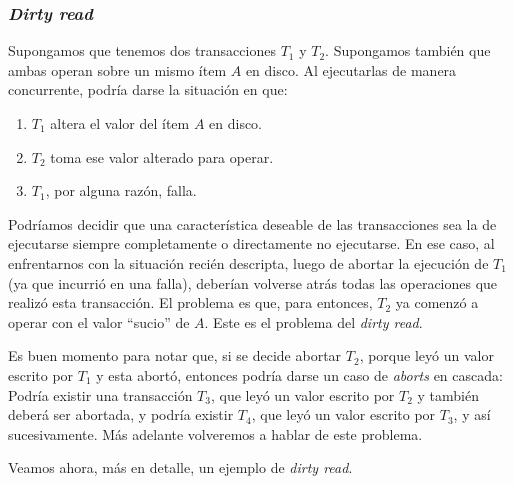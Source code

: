 \documentclass[english,titlepage]{article}
\theoremstyle{definition}
\theoremstyle{definition}
\begin{document}
\subsubsection{\emph{Dirty read}}

Supongamos que tenemos dos transacciones $T_1$ y $T_2$. Supongamos también que
ambas operan sobre un mismo ítem $A$ en disco. Al ejecutarlas de manera
concurrente, podría darse la situación en que:

\begin{enumerate}
    \item $T_1$ altera el valor del ítem $A$ en disco.
    \item $T_2$ toma ese valor alterado para operar.
    \item $T_1$, por alguna razón, falla.
\end{enumerate}

Podríamos decidir que una característica deseable de las transacciones sea la
de ejecutarse siempre completamente o directamente no ejecutarse. En ese caso,
al enfrentarnos con la situación recién descripta, luego de abortar la
ejecución de $T_1$ (ya que incurrió en una falla), deberían volverse atrás
todas las operaciones que realizó esta transacción. El problema es que, para
entonces, $T_2$ ya comenzó a operar con el valor ``sucio'' de $A$. Este es el
problema del \emph{dirty read}.

Es buen momento para notar que, si se decide abortar $T_2$, porque leyó un
valor escrito por $T_1$ y esta abortó, entonces podría darse un caso de
\emph{aborts} en cascada: Podría existir una transacción $T_3$, que leyó un
valor escrito por $T_2$ y también deberá ser abortada, y podría existir $T_4$,
que leyó un valor escrito por $T_3$, y así sucesivamente. Más adelante
volveremos a hablar de este problema.

Veamos ahora, más en detalle, un ejemplo de \emph{dirty read}.
\end{document}
